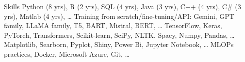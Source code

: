 
\begin{rubric}{Skills}
\entry*[Coding]
Python (8 yrs), R (2 yrs), SQL (4 yrs), Java (3 yrs), C++ (4 yrs), C\# (3 yrs), Matlab (4 yrs), \ldots
{} Training from scratch/fine-tuning/API: Gemini,  GPT family, LLaMA family, T5, BART, Mistral, BERT, \ldots
{}
	TensorFlow, Keras, PyTorch, Transformers, Scikit-learn, SciPy, NLTK, Spacy, Numpy, Pandas, \ldots
\entry*[Visualization]
	Matplotlib, Searborn, Pyplot, Shiny, Power Bi, Jupyter Notebook, \ldots
\entry*[Deployment]
	MLOPs practices, Docker, Microsoft Azure, Git, \ldots
\end{rubric}